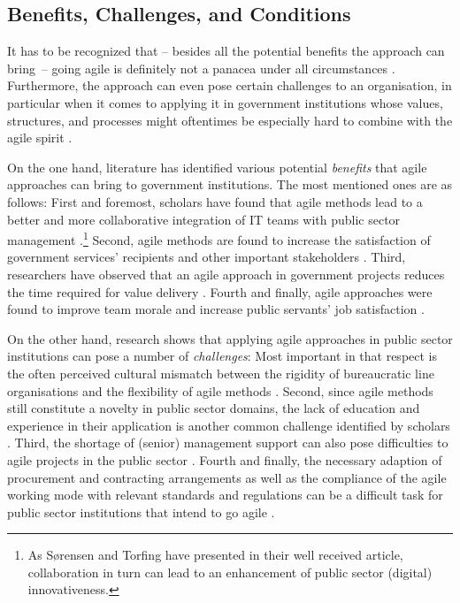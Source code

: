 \subsection{Benefits, Challenges, and Conditions}\label{Benefits, Challenges, and Conditions}
It has to be recognized that – besides all the potential benefits the approach can bring~– going agile is definitely not a panacea under all circumstances \parencite{Rigby2016}. Furthermore, the approach can even pose certain challenges to an organisation, in particular when it comes to applying it in government institutions whose values, structures, and processes might oftentimes be especially hard to combine with the agile spirit \parencite{Hajjdiab2011}.

On the one hand, literature has identified various potential \textit{benefits} that agile approaches can bring to government institutions. The most mentioned ones are as follows: First and foremost, scholars have found that agile methods lead to a better and more collaborative integration of IT teams with public sector management \parencite{Upender2005,berger2005uk, Berger2007,Dubinsky2005}.\footnote{As Sørensen and Torfing \parencite*{Sorensen2011} have presented in their well received article, collaboration in turn can lead to an enhancement of public sector (digital) innovativeness.} Second, agile methods are found to increase the satisfaction of government services' recipients and other important stakeholders \parencite{Fruhling2008,  Fulgham2011, iliev2009case}. Third, researchers have observed that an agile approach in government projects reduces the time required for value delivery \parencite{Upender2005, Surdu2006, McMahon2006, Moore2001}. Fourth and finally, agile approaches were found to improve team morale and increase public servants' job satisfaction \parencite{Hajjdiab2011, Vacari2015, Dubinsky2005}. 

On the other hand, research shows that applying agile approaches in public sector institutions can pose a number of \textit{challenges}: Most important in that respect is the often perceived cultural mismatch between the rigidity of bureaucratic line organisations and the flexibility of agile methods \parencite{Mergel, Fruhling2008, Altukhova2016, berger2005uk, Greve2019}. Second, since agile methods still constitute a novelty in public sector domains, the lack of education and experience in their application is another common challenge identified by scholars \parencite{Nuottila2016, McMahon2006, Fridman2016}. Third, the shortage of (senior) management support can also pose difficulties to agile projects in the public sector \parencite{Mergel,Berger2007,Dubinsky2005, Hajjdiab2011}. Fourth and finally, the necessary adaption of procurement and contracting arrangements as well as the compliance of the agile working mode with relevant standards and regulations can be a difficult task for public sector institutions that intend to go agile \parencite{Nuottila2016,Mergel, Fruhling2008, Fulgham2011}.

